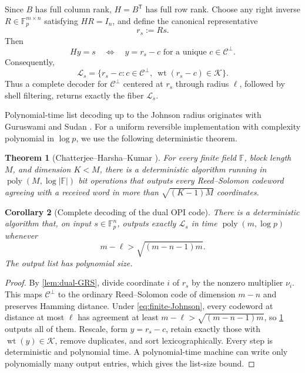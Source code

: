 \documentclass[11pt,letterpaper]{article}
\newtheorem{theorem}{Theorem}[section]
\newtheorem{corollary}[theorem]{Corollary}
\theoremstyle{definition}
\newcommand{\F}{\mathbb{F}}
\newcommand{\C}{\mathcal{C}}
\newcommand{\Kcal}{\mathcal{K}}
\newcommand{\Lcal}{\mathcal{L}}
\newcommand{\wt}{\operatorname{wt}}
\newcommand{\poly}{\operatorname{poly}}
\newcommand{\abs}[1]{\left\lvert #1\right\rvert}
\begin{document}
Since $B$ has full column rank, $H=B^{\mathsf T}$ has full row rank.  Choose any right inverse $R\in\F_p^{m\times n}$ satisfying $HR=I_n$, and define the canonical representative
\begin{equation}
   r_s:=Rs.
   \label{eq:representative}
\end{equation}
Then
\begin{equation}
   Hy=s
   \quad\Longleftrightarrow\quad
   y=r_s-c\text{ for a unique }c\in\C^\perp.
   \label{eq:coset-bijection}
\end{equation}
Consequently,
\begin{equation}
   \Lcal_s
   =\{r_s-c:c\in\C^\perp,\ \wt(r_s-c)\in\Kcal\}.
   \label{eq:fiber-list}
\end{equation}
Thus a complete decoder for $\C^\perp$ centered at $r_s$ through radius $\ell$, followed by shell filtering, returns exactly the fiber $\Lcal_s$.

Polynomial-time list decoding up to the Johnson radius originates with Guruswami and Sudan \cite{GuruswamiSudan1999}.  For a uniform reversible implementation with complexity polynomial in $\log p$, we use the following deterministic theorem.

\begin{theorem}[Chatterjee--Harsha--Kumar \cite{ChatterjeeEtAl2026}]
\label{thm:CHK}
For every finite field $\F$, block length $M$, and dimension $K<M$, there is a deterministic algorithm running in $\poly(M,\log\abs{\F})$ bit operations that outputs every Reed--Solomon codeword agreeing with a received word in more than $\sqrt{(K-1)M}$ coordinates.
\end{theorem}

\begin{corollary}[Complete decoding of the dual OPI code]
\label{cor:dual-list-decoding}
There is a deterministic algorithm that, on input $s\in\F_p^n$, outputs exactly $\Lcal_s$ in time $\poly(m,\log p)$ whenever
\begin{equation}
   m-\ell>\sqrt{(m-n-1)m}.
   \label{eq:finite-Johnson}
\end{equation}
The output list has polynomial size.
\end{corollary}

\begin{proof}
By \cref{lem:dual-GRS}, divide coordinate $i$ of $r_s$ by the nonzero multiplier $\nu_i$.  This maps $\C^\perp$ to the ordinary Reed--Solomon code of dimension $m-n$ and preserves Hamming distance.  Under \cref{eq:finite-Johnson}, every codeword at distance at most $\ell$ has agreement at least $m-\ell>\sqrt{(m-n-1)m}$, so \cref{thm:CHK} outputs all of them.  Rescale, form $y=r_s-c$, retain exactly those with $\wt(y)\in\Kcal$, remove duplicates, and sort lexicographically.  Every step is deterministic and polynomial time.  A polynomial-time machine can write only polynomially many output entries, which gives the list-size bound.
\end{proof}
\end{document}
